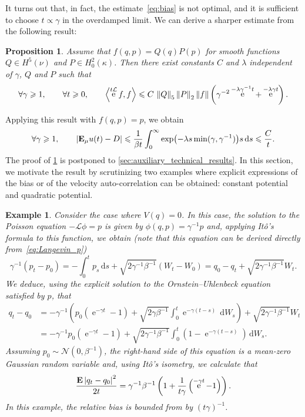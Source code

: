 \documentclass[11pt,a4paper]{article}
\DeclareMathOperator{\e}{e}
\newcommand{\expect}[0]{\mathbf{E}}
\renewcommand{\d}{\mathrm d}
\theoremstyle{plain}
\newtheorem{proposition}{Proposition}[section]
\newtheorem{example}{Example}[section]
\numberwithin{equation}{section}
\renewcommand{\leq}{\leqslant}
\renewcommand{\geq}{\geqslant}
\begin{document}
It turns out that, in fact, the estimate~\eqref{eq:bias} is not optimal,
and it is sufficient to choose $t \propto \gamma$ in the overdamped limit.
We can derive a sharper estimate from the following result:
\begin{proposition}
    \label{proposition:semigroup_meanzero_observable}
    Assume that $f(q, p) = Q(q) P(p)$ for smooth functions $Q \in H^5(\nu)$ and $P \in H^2_0(\kappa)$.
    Then there exist constants $C$ and $\lambda$ independent of $\gamma$, $Q$ and $P$ such that
    \[
        \forall \gamma \geq 1, \qquad
        \forall t \geq 0, \qquad
        \ip{\e^{t \mathcal L}f}{f} \leq C \, \norm{Q}_5  \norm{P}_2 \norm{f}  \left( \gamma^{-2} \e^{- \lambda \gamma^{-1} t} + \e^{-\lambda  \gamma t} \right).
    \]
\end{proposition}
Applying this result with $f(q, p) = p$, we obtain
\begin{equation*}
    \forall \gamma \geq 1, \qquad
    \abs{\expect_{\mu} u(t) - D}
    \leq \frac{1}{\beta t}\int_{0}^{\infty} \exp\bigl(- \lambda s \min(\gamma, \gamma^{-1})\bigr) s \, \d s
    \leq \frac{C}{t}.
\end{equation*}
The proof of \cref{proposition:semigroup_meanzero_observable} is postponed to \cref{sec:auxiliary_technical_results}.
In this section,
we motivate the result by scrutinizing two examples where
explicit expressions of the bias or of the velocity auto-correlation can be obtained:
constant potential and quadratic potential.
\begin{example}
    Consider the case where $V(q) = 0$.
    In this case, the solution to the Poisson equation $- \mathcal L \phi = p$ is given by $\phi(q, p) = \gamma^{-1} p$ and,
    applying Itô's formula to this function, we obtain
    (note that this equation can be derived directly from~\eqref{eq:Langevin_p})
    \[
        \gamma^{-1}(p_t - p_0) = - \int_{0}^{t} p_s \, \d s + \sqrt{2 \gamma^{-1} \beta^{-1}} (W_t - W_0)
        = q_0 - q_t + \sqrt{2 \gamma^{-1} \beta^{-1}} W_t.
    \]
    We deduce, using the explicit solution to the Ornstein--Uhlenbeck equation satisfied by $p$, that
    \begin{align*}
        q_t - q_0
        &= - \gamma^{-1} \left( p_0 \left(\e^{-\gamma t} - 1\right) + \sqrt{2 \gamma \beta^{-1}}\int_{0}^{t} \e^{-\gamma (t - s)} \, \d W_s \right)
        + \sqrt{2 \gamma^{-1} \beta^{-1}} W_t \\
        &=  - \gamma^{-1} p_0 \left(\e^{-\gamma t} - 1\right) + \sqrt{2 \gamma^{-1} \beta^{-1}}\int_{0}^{t} \left(1 - \e^{-\gamma (t - s)}\right) \, \d W_s.
    \end{align*}
    Assuming $p_0 \sim \mathcal N(0, \beta^{-1})$,
    the right-hand side of this equation is a mean-zero Gaussian random variable and,
    using It\^o's isometry, we calculate that
    \[
        \frac{\expect \abs{q_t - q_0}^2}{2t} = \gamma^{-1} \beta^{-1} \left( 1 + \frac{1}{t \gamma} \left(\e^{-\gamma t} - 1\right) \right).
    \]
    In this example, the relative bias is bounded from by $(t \gamma)^{-1}$.
\end{example}
\end{document}
